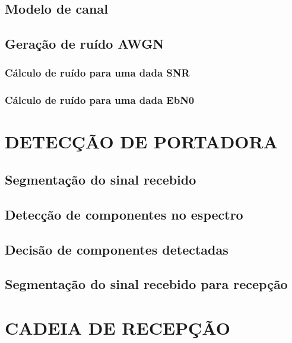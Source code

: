 \subsection{Modelo de canal}\label{sec:modelo_canal}

\subsection{Geração de ruído AWGN}\label{sec:geracao_ruido}

\subsubsection{Cálculo de ruído para uma dada SNR}\label{sec:calculo_ruido}

\subsubsection{Cálculo de ruído para uma dada EbN0}\label{sec:calculo_ruido_ebn0}

\section{DETECÇÃO DE PORTADORA}\label{sec:detector}

\subsection{Segmentação do sinal recebido}\label{sec:segmentacao}

\subsection{Detecção de componentes no espectro}\label{sec:comparacao_potencia}

\subsection{Decisão de componentes detectadas}\label{sec:decisao}

\subsection{Segmentação do sinal recebido para recepção}\label{sec:segmentacao_recepcao}

\section{CADEIA DE RECEPÇÃO}\label{sec:recepcao}    

